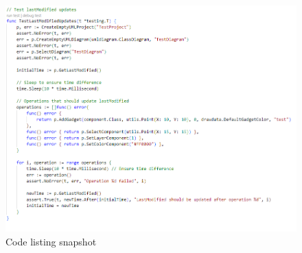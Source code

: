 \documentclass[12pt]{article}
\begin{document}
    \begin{figure}[H]
        \begin{center}
            \includegraphics[width=0.95\linewidth]
            {assets/hw7/test1.png}
            \caption{Code listing snapshot}
        \end{center}
    \end{figure}
\end{document}
